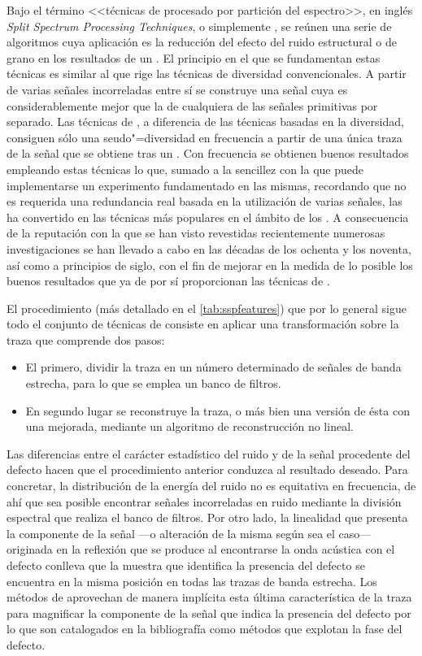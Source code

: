 Bajo el término <<técnicas de procesado por partición del espectro>>, en
inglés \emph{Split Spectrum Processing Techniques}, o simplemente
, se reúnen una serie de algoritmos cuya aplicación es la
reducción del efecto del ruido estructural o de grano en los resultados de
un . El principio en el que se fundamentan estas técnicas es
similar al que rige las técnicas de diversidad convencionales. A partir de
varias señales incorreladas entre sí se construye una señal cuya 
es considerablemente mejor que la  de cualquiera de las señales
primitivas por separado. Las técnicas de , a diferencia de las
técnicas basadas en la diversidad, consiguen sólo una seudo"=diversidad en
frecuencia a partir de una única traza de la señal que se obtiene tras un
. Con frecuencia se obtienen buenos resultados empleando estas
técnicas lo que, sumado a la sencillez con la que puede implementarse un
experimento fundamentado en las mismas, recordando que no es requerida una
redundancia real basada en la utilización de varias señales, las ha
convertido en las técnicas más populares en el ámbito de los . A
consecuencia de la reputación con la que se han visto revestidas
recientemente numerosas investigaciones se han llevado a cabo en las
décadas de los ochenta y los noventa, así como a principios de siglo, con
el fin de mejorar en la medida de lo posible los buenos resultados que ya
de por sí proporcionan las técnicas de .

El procedimiento (más detallado en el \cref{tab:sspfeatures}) que por lo
general sigue todo el conjunto de técnicas de  consiste en aplicar
una transformación sobre la traza que comprende dos pasos:

\begin{itemize}
	\item El primero, dividir la traza en un número determinado de
		señales de banda estrecha, para lo que se emplea un banco
		de filtros.
	\item En segundo lugar se reconstruye la traza, o más bien una
		versión de ésta con una  mejorada, mediante un
		algoritmo de reconstrucción no lineal.
\end{itemize}

Las diferencias entre el carácter estadístico del ruido y de la señal
procedente del defecto hacen que el procedimiento anterior conduzca al
resultado deseado. Para concretar, la distribución de la energía del ruido
no es equitativa en frecuencia, de ahí que sea posible encontrar señales
incorreladas en ruido mediante la división espectral que realiza el banco
de filtros. Por otro lado, la linealidad que presenta la componente de la
señal ---o alteración de la misma según sea el caso--- originada en la
reflexión que se produce al encontrarse la onda acústica con el defecto
conlleva que la muestra que identifica la presencia del defecto se
encuentra en la misma posición en todas las trazas de banda estrecha. Los
métodos de  aprovechan de manera implícita esta última
característica de la traza para magnificar la componente de la señal que
indica la presencia del defecto por lo que son catalogados en la
bibliografía como métodos que explotan la fase del defecto.



